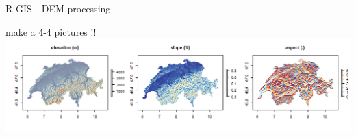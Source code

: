 \documentclass[8pt,ignorenonframetext,]{beamer}
\newcommand{\columnsend}{\end{columns}}
\begin{document}

\begin{frame}{R GIS - DEM processing}

make a 4-4 pictures !! \includegraphics{imgPres/R_GIS01.png}

\end{frame}
\end{document}
